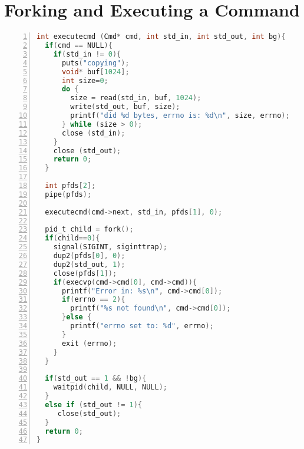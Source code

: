 \section{Forking and Executing a Command}
\label{forkexec}
\begin{lstlisting}[language=C, numbers=left, frame=single, breaklines=true]
int executecmd (Cmd* cmd, int std_in, int std_out, int bg){
  if(cmd == NULL){
    if(std_in != 0){
      puts("copying");
      void* buf[1024];
      int size=0;
      do {
        size = read(std_in, buf, 1024);
        write(std_out, buf, size);
        printf("did %d bytes, errno is: %d\n", size, errno);
      } while (size > 0);
      close (std_in);
    }
    close (std_out);
    return 0;
  }

  int pfds[2];
  pipe(pfds);

  executecmd(cmd->next, std_in, pfds[1], 0);

  pid_t child = fork();
  if(child==0){
    signal(SIGINT, siginttrap);
    dup2(pfds[0], 0);
    dup2(std_out, 1);
    close(pfds[1]);
    if(execvp(cmd->cmd[0], cmd->cmd)){
      printf("Error in: %s\n", cmd->cmd[0]);
      if(errno == 2){
        printf("%s not found\n", cmd->cmd[0]);
      }else {
        printf("errno set to: %d", errno);
      }
      exit (errno);
    }
  }

  if(std_out == 1 && !bg){
    waitpid(child, NULL, NULL);
  }
  else if (std_out != 1){
     close(std_out);
  }
  return 0;
}
\end{lstlisting}
